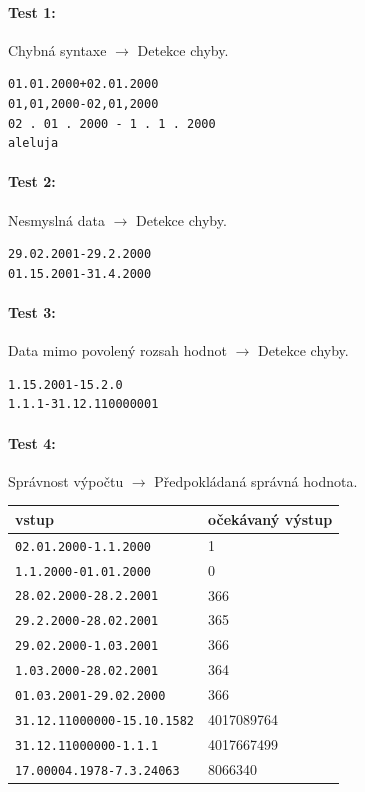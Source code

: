 \documentclass[12pt,a4paper,titlepage,final]{article}
\begin{document}
\paragraph{Test 1:} Chybná syntaxe $\longrightarrow$ Detekce chyby.
\begin{verbatim}
01.01.2000+02.01.2000
01,01,2000-02,01,2000
02 . 01 . 2000 - 1 . 1 . 2000
aleluja
\end{verbatim} 

\paragraph{Test 2:} Nesmyslná data $\longrightarrow$ Detekce chyby.
\begin{verbatim}
29.02.2001-29.2.2000
01.15.2001-31.4.2000
\end{verbatim} 

\paragraph{Test 3:} Data mimo povolený rozsah hodnot $\longrightarrow$ Detekce
chyby.
\begin{verbatim}
1.15.2001-15.2.0
1.1.1-31.12.110000001
\end{verbatim} 

\paragraph{Test 4:} Správnost výpočtu $\longrightarrow$ Předpokládaná správná
hodnota.

\vspace{1em}\begin{tabular}{ll} %
vstup & očekávaný výstup \\
\hline
\verb|02.01.2000-1.1.2000| & 1 \\
\verb|1.1.2000-01.01.2000| & 0 \\
\verb|28.02.2000-28.2.2001| & 366 \\
\verb|29.2.2000-28.02.2001| & 365 \\
\verb|29.02.2000-1.03.2001| & 366 \\
\verb|1.03.2000-28.02.2001| & 364 \\
\verb|01.03.2001-29.02.2000| & 366 \\
\verb|31.12.11000000-15.10.1582| & 4017089764 \\
\verb|31.12.11000000-1.1.1| & 4017667499 \\
\verb|17.00004.1978-7.3.24063| & 8066340 \\
\end{tabular}
\end{document}

